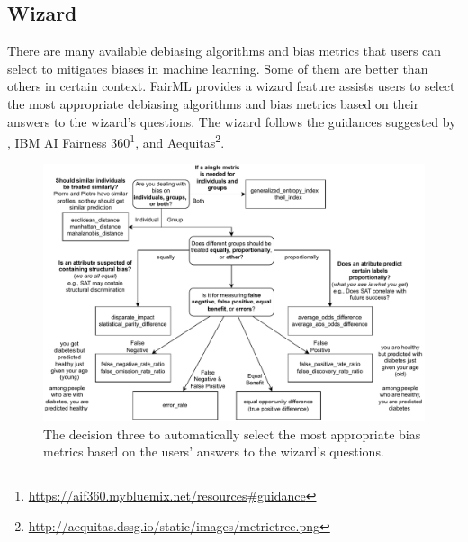\documentclass[sigconf,review]{acmart}
\begin{document}
\subsection{Wizard}
\label{sec:wizard}
There are many available debiasing algorithms and bias metrics that users can select to mitigates biases in machine learning. Some of them are better than others in certain context. FairML provides a wizard feature assists users to select the most appropriate debiasing algorithms and bias metrics based on their answers to the wizard's questions. The wizard follows the guidances suggested by \cite{mahoney2020ai}, IBM AI Fairness 360\footnote{\url{https://aif360.mybluemix.net/resources\#guidance}}, and Aequitas\footnote{\url{http://aequitas.dssg.io/static/images/metrictree.png}}.

\begin{figure}
	\includegraphics[width=\linewidth]{figures/wizard-metric}
	\caption{The decision three to automatically select the most appropriate bias metrics based on the users' answers to the wizard's questions.}
	\label{fig:wizard-metric}
\end{figure}
\end{document}
